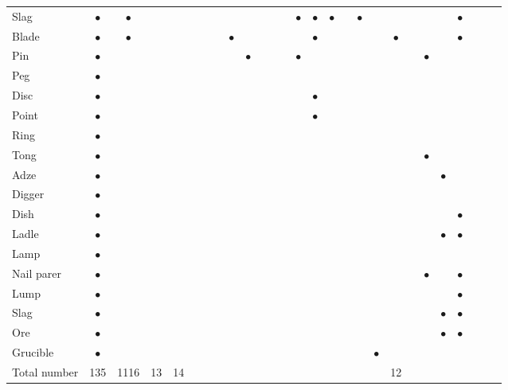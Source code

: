 {{{\begin{longtable}{|l|c|c|c|c|c|c|c|c|c|c|c|c|c|c|c|c|c|c|c|c|c|c|c|c|c|c|}
 Slag &$\bullet$&$\bullet$&&&&&&&&&&&$\bullet$&$\bullet$&$\bullet$&&$\bullet$&&&&&&$\bullet$&&& \\
Blade &$\bullet$&$\bullet$&&&&&&$\bullet$&&&&&&$\bullet$&&&&&$\bullet$&&&&$\bullet$&&& \\
Pin &$\bullet$&&&&&&&&$\bullet$&&&&$\bullet$&&&&&&&&$\bullet$&&&&& \\
Peg &$\bullet$&&&&&&&&&&&&&&&&&&&&&&&&& \\
Disc &$\bullet$&&&&&&&&&&&&&$\bullet$&&&&&&&&&&&& \\
Point &$\bullet$&&&&&&&&&&&&&$\bullet$&&&&&&&&&&&& \\
Ring &$\bullet$&&&&&&&&&&&&&&&&&&&&&&&&& \\
Tong &$\bullet$&&&&&&&&&&&&&&&&&&&&$\bullet$ &&&&& \\
Adze &$\bullet$&&&&&&&&&&&&&&&&&&&&&$\bullet$&&&& \\
Digger &$\bullet$&&&&&&&&&&&&&&&&&&&&&&&&& \\
Dish &$\bullet$&&&&&&&&&&&&&&&&&&&&&&$\bullet$&&& \\
Ladle &$\bullet$&&&&&&&&&&&&&&&&&&&&&$\bullet$&$\bullet$&&& \\
Lamp &$\bullet$&&&&&&&&&&&&&&&&&&&&&&&&& \\
Nail parer &$\bullet$&&&&&&&&&&&&&&&&&&&&$\bullet$&&$\bullet$&&& \\
Lump &$\bullet$&&&&&&&&&&&&&&&&&&&&&&$\bullet$&&& \\
Slag &$\bullet$&&&&&&&&&&&&&&&&&&&&&$\bullet$&$\bullet$&&& \\
Ore &$\bullet$&&&&&&&&&&&&&&&&&&&&&$\bullet$&$\bullet$&&& \\
Grucible &$\bullet$&&&&&&&&&&&&&&&&&$\bullet$&&&&&&&& \\
\hline
{Total number} &135 &1116& 13& 14&&&&&&&&&&&&&&&12&&&&&&& \\
\hline 
\end{longtable}
}}

\newpage

}
